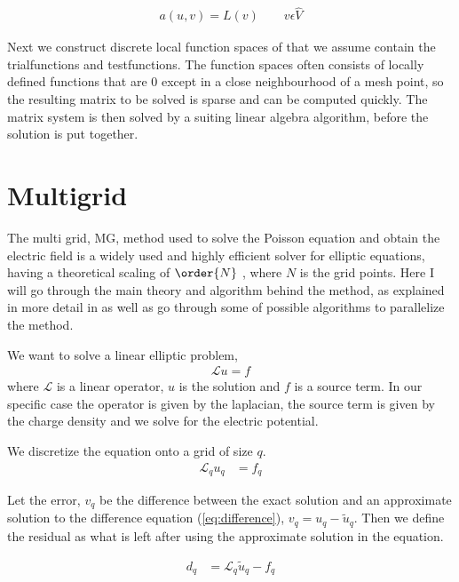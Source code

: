 		\begin{align}
			a(u,v) = L(v)	\qquad v\epsilon \hat{V}
		\end{align}

		Next we construct discrete local function spaces of that we assume contain
		the trialfunctions and testfunctions. The function spaces often consists of
		locally defined functions that are \(0\) except in a close neighbourhood of
		a mesh point, so the resulting matrix to be solved is sparse and can be computed
		quickly. The matrix system is then solved by a suiting linear algebra algorithm,
		before the solution is put together.


\section{Multigrid}
	The multi grid, MG, method used to solve the Poisson equation and obtain the
	electric field is a widely used and highly efficient solver for elliptic equations,
	having a theoretical scaling of \(\order{N}\) \citep{press_numerical_1988},
	where \(N\) is the grid points. Here I will go through the main theory and
	algorithm behind the method, as explained in more detail in \citep{press_numerical_1988,trottenberg_multigrid_2000}
	as well as go through some of possible algorithms to parallelize the method.

	We want to solve a linear elliptic problem,
		\begin{align}
			\mathcal{L} u = f
		\end{align}
	where \(\mathcal{L}\) is a linear operator, \(u\) is the solution and \(f\) is
  a source term. In our specific case the operator is given by the laplacian, the
  source term is given by the charge density and we solve for the electric potential.

	We discretize the equation onto a grid of size \(q\).
	\begin{align}
		\mathcal{L}_q u_q &= f_q \label{eq:difference}
	\end{align}

	Let the error, \(v_q\) be the difference between the exact solution and an approximate
  solution to the difference equation (\ref{eq:difference}), \( v_q = u_q - \tilde{u}_q \).
  Then we define the residual as what is left after using the approximate solution
  in the equation.

	\begin{align}
		d_q &= \mathcal{L}_q \tilde{u}_q - f_q
	\end{align}

